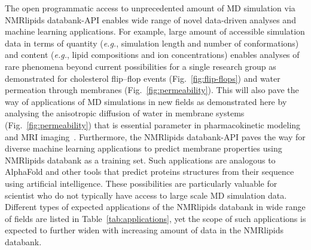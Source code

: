 \documentclass[fleqn,10pt]{wlscirep}
\begin{document}
The open programmatic access to unprecedented amount of MD simulation via NMRlipids databank-API enables wide range of novel data-driven analyses and machine learning applications. For example, large amount of accessible simulation data in terms of quantity (\textit{e.g.}, simulation length and number of conformations) and content (\textit{e.g.}, lipid compositions and ion concentrations) enables analyses of rare phenomena beyond current possibilities for a single research group as demonstrated for cholesterol flip--flop events (Fig.~\ref{fig:flip-flops}) and water permeation through membranes (Fig.~\ref{fig:permeability}). This will also pave the way of applications of MD simulations in new fields as demonstrated here by analysing the anisotropic diffusion of water in membrane systems (Fig.~\ref{fig:permeability}) that is essential parameter in pharmacokinetic modeling and MRI imaging~\cite{nitsche19,topgaard20}. Furthermore, the NMRlipids databank-API paves the way for diverse machine learning applications to 
predict membrane properties using NMRlipids databank as a training set. Such applications are analogous to AlphaFold \cite{jumper21} and other tools that predict proteins structures from their sequence using artificial intelligence. These possibilities are particularly valuable for scientist who do not typically have access to large scale MD simulation data.
%
%
Different types of expected applications of the NMRlipids databank in wide range of fields are listed in Table~\ref{tab:applications}, yet the scope of such applications
is expected to further widen with increasing amount of data in the NMRlipids databank.  
\end{document}

